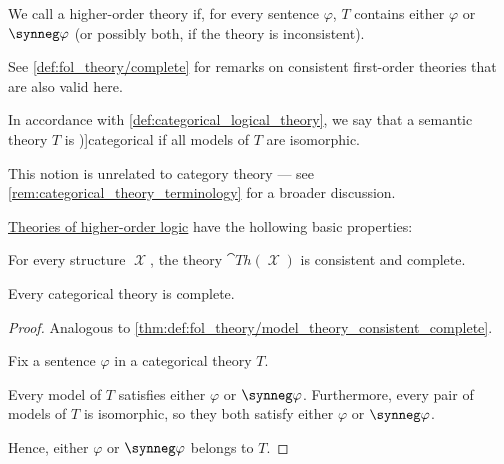 \begin{definition}
\begin{thmenum}
     We call a higher-order theory  if, for every sentence \( \varphi \), \( T \) contains either \( \varphi \) or \( \synneg \varphi \) (or possibly both, if the theory is inconsistent).

    See \cref{def:fol_theory/complete} for remarks on consistent first-order theories that are also valid here.

     In accordance with \cref{def:categorical_logical_theory}, we say that a semantic theory \( T \) is \term[en=categorical (theory) (\cite[exerc. X5502]{Andrews2002Logic})]{categorical} if all models of \( T \) are isomorphic.

    This notion is unrelated to category theory --- see \cref{rem:categorical_theory_terminology} for a broader discussion.
  \end{thmenum}
\end{definition}

\begin{proposition}\label{thm:def:hol_theory}
  \hyperref[def:hol_theory]{Theories of higher-order logic} have the hollowing basic properties:
  \begin{thmenum}
     For every structure \( \mscrX \), the theory \( \cat{Th}(\mscrX) \) is consistent and complete.

     Every categorical theory is complete.
  \end{thmenum}
\end{proposition}
\begin{proof}
   Analogous to \cref{thm:def:fol_theory/model_theory_consistent_complete}.

   Fix a sentence \( \varphi \) in a categorical theory \( T \).

  Every model of \( T \) satisfies either \( \varphi \) or \( \synneg \varphi \). Furthermore, every pair of models of \( T \) is isomorphic, so they both satisfy either \( \varphi \) or \( \synneg \varphi \).

  Hence, either \( \varphi \) or \( \synneg \varphi \) belongs to \( T \).
\end{proof}


